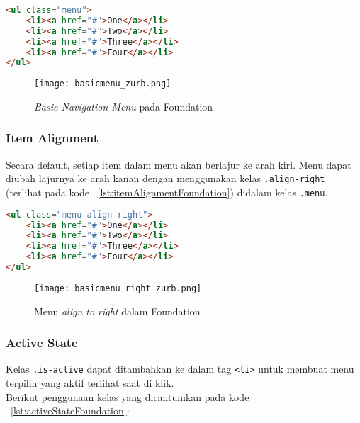 \begin{lstlisting}[style=customhtml, language=HTML,  basicstyle=\ttfamily, frame=single, columns=fullflexible, keepspaces=true, breaklines=true, showstringspaces=false, label={lst:basicFoundation}, caption=Basic Menu Foundation 6.] 
<ul class="menu">
	<li><a href="#">One</a></li>
	<li><a href="#">Two</a></li>
	<li><a href="#">Three</a></li>
	<li><a href="#">Four</a></li>
</ul>
\end{lstlisting}

\begin{figure} [H]  
	\centering  
	\texttt{[image: basicmenu\_zurb.png]}  
	\caption{\textit{Basic Navigation Menu} pada Foundation}
	\label{fig:navFoundation}
\end{figure}

\subsubsection{Item Alignment}
Secara default, setiap item dalam menu akan berlajur ke arah kiri. Menu dapat diubah lajurnya ke arah kanan dengan menggunakan kelas \texttt{.align-right} (terlihat pada kode ~\ref{lst:itemAlignmentFoundation}) didalam kelas \texttt{.menu}.
\begin{lstlisting}[style=customhtml, language=HTML,  basicstyle=\ttfamily, frame=single, columns=fullflexible, keepspaces=true, breaklines=true, showstringspaces=false, label={lst:itemAlignmentFoundation}, caption=Item Alignment Foundation 6.] 
<ul class="menu align-right">
	<li><a href="#">One</a></li>
	<li><a href="#">Two</a></li>
	<li><a href="#">Three</a></li>
	<li><a href="#">Four</a></li>
</ul>
\end{lstlisting}

\begin{figure}[H]
	\centering  
	\texttt{[image: basicmenu\_right\_zurb.png]}  
	\caption{Menu \textit{align to right} dalam Foundation}
	\label{fig:alignRightFoundation}
\end{figure}


\subsubsection{Active State}
Kelas \texttt{.is-active} dapat ditambahkan ke dalam tag \texttt{<li>} untuk membuat menu terpilih yang aktif terlihat saat di klik. \\
Berikut penggunaan kelas yang dicantumkan pada kode ~\ref{lst:activeStateFoundation}:

